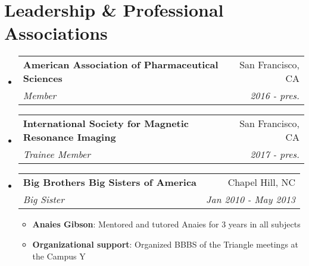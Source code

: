 \documentclass[letterpaper,11pt]{article}
\makeatletter
\newcommand{\resumeItem}[2]{
  \item\small{
    \textbf{#1}{: #2 \vspace{-2pt}}
  }
}
\newcommand{\resumeSubheading}[4]{
  \vspace{-1pt}\item
    \begin{tabular*}{0.97\textwidth}{l@{\extracolsep{\fill}}r}
      \textbf{#1} & #2 \\
      \textit{\small#3} & \textit{\small #4} \\
    \end{tabular*}\vspace{-5pt}
}
\newcommand{\resumeSubHeadingListStart}{\begin{itemize}[leftmargin=*]}
\newcommand{\resumeSubHeadingListEnd}{\end{itemize}}
\newcommand{\resumeItemListStart}{\begin{itemize}}
\newcommand{\resumeItemListEnd}{\end{itemize}\vspace{-5pt}}
\makeatother
\begin{document}
    
    
\section{Leadership \& Professional Associations}    
    \resumeSubHeadingListStart
        \resumeSubheading
              {American Association of Pharmaceutical Sciences}{San Francisco, CA}
              {Member}{2016 - pres.}
        \resumeSubheading
              {International Society for Magnetic Resonance Imaging}{San Francisco, CA}
              {Trainee Member}{2017 - pres.}
        \resumeSubheading
            {Big Brothers Big Sisters of America}{Chapel Hill, NC}
            {Big Sister}{Jan 2010 - May 2013}
            \resumeItemListStart
                \resumeItem{Anaies Gibson}{Mentored and tutored Anaies for 3 years in all subjects}
                \resumeItem{Organizational support}{Organized BBBS of the Triangle meetings at the Campus Y}
            \resumeItemListEnd
    \resumeSubHeadingListEnd
\end{document}
